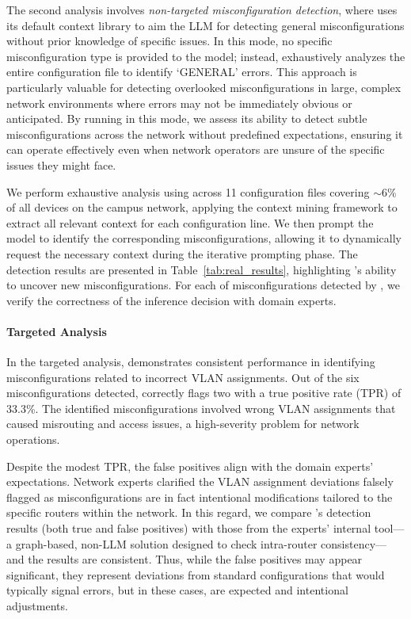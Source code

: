 The second analysis involves \textit{non-targeted misconfiguration detection}, where \sysname{} uses its default context library to aim the LLM for detecting general misconfigurations without prior knowledge of specific issues. In this mode, no specific misconfiguration type is provided to the model; instead, \sysname{} exhaustively analyzes the entire configuration file to identify `GENERAL' errors. 
This approach is particularly valuable for detecting overlooked misconfigurations in large, complex network environments where errors may not be immediately obvious or anticipated. By running \sysname{} in this mode, we assess its ability to detect subtle misconfigurations across the network without predefined expectations, ensuring it can operate effectively even when network operators are unsure of the specific issues they might face.

We perform exhaustive analysis using \sysname{} across 11 configuration files covering $\sim6\%$ of all devices on the campus network, applying the context mining framework to extract all relevant context for each configuration line. We then prompt the model to identify the corresponding misconfigurations, allowing it to dynamically request the necessary context during the iterative prompting phase. The detection results are presented in Table~\ref{tab:real_results}, highlighting \sysname{}'s ability to uncover new misconfigurations. For each of misconfigurations detected by \sysname{}, we verify the correctness of the inference decision with domain experts. 

\paragraph{Targeted Analysis} 
In the targeted analysis, \sysname{} demonstrates consistent performance
in identifying misconfigurations related to incorrect VLAN assignments. Out of the six misconfigurations detected, \sysname{} correctly flags two with a true positive rate (TPR) of 33.3\%. The identified misconfigurations involved wrong VLAN assignments that caused misrouting and access issues, a high-severity problem for network operations.

Despite the modest TPR, the false positives align with the domain experts' expectations. Network experts clarified the VLAN assignment deviations falsely flagged as misconfigurations are in fact intentional modifications tailored to the specific routers within the network. In this regard, we compare \sysname{}'s detection results (both true and false positives) with those from the experts' internal tool—a graph-based, non-LLM solution designed to check intra-router consistency— and the results are consistent.
Thus, while the false positives may appear significant, they represent deviations from standard configurations that would typically signal errors, but in these cases, are expected and intentional adjustments.



